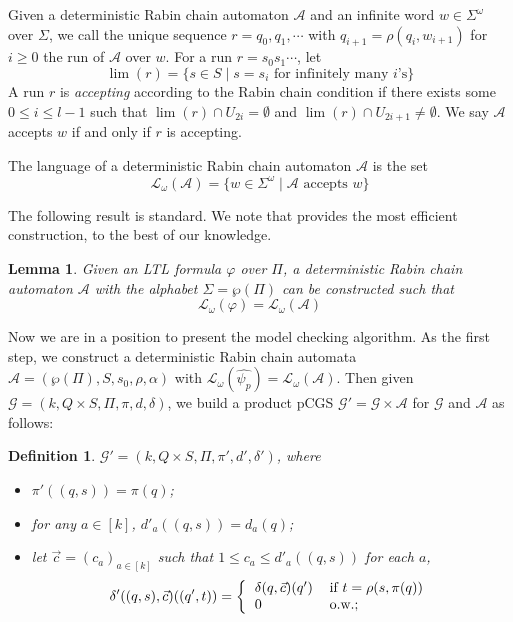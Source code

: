 \documentclass[times, 10 pt,twocolumn]{article}
\newtheorem{definition}[theorem]{Definition}{\bfseries}{\rm}
\newtheorem{lemma}[theorem]{Lemma}{\bfseries}{\itshape}
\newcommand{\mc}[1]{\mathcal{#1}}
\begin{document}
Given a deterministic Rabin chain automaton $\mc{A}$ and an
infinite word $w\in \Sigma^{\omega}$ over $\Sigma$, we call the
unique sequence $r=q_0,q_1, \cdots$ with $q_{i+1}=\rho(q_i,
w_{i+1})$ for $i\geq 0$ the run of $\mc{A}$ over $w$. For a run
$r=s_0s_1\cdots$, let
\[\lim(r)=\{s\in S\mid s=s_i\mbox{ for infinitely many }i\mbox{'s}\}\]
A run $r$ is \emph{accepting} according to the Rabin chain
condition if there exists some $0\leq i\leq l-1$ such that
$\lim(r)\cap U_{2i}=\emptyset$ and $\lim(r)\cap
U_{2i+1}\neq\emptyset$. We say $\mc{A}$ accepts $w$ if and only if
$r$ is accepting.

The language of a deterministic Rabin chain automaton $\mc{A}$ is
the set
\[\mc{L}_{\omega}(\mc{A})=\{w\in \Sigma^{\omega}\mid \mc{A}\mbox{ accepts }w\}\]

The following result is standard. We note that \cite{Pit06}
provides the most efficient construction, to the best of our
knowledge.
\begin{lemma}
  Given an LTL formula $\varphi$ over $\Pi$, a deterministic Rabin
  chain automaton $\mc{A}$ with the alphabet $\Sigma=\wp(\Pi)$ can be
  constructed such that
  \[\mc{L}_{\omega}(\varphi)=\mc{L}_{\omega}(\mc{A})\]
\end{lemma}

Now we are in a position to present the model checking algorithm.
As the first step, we construct a deterministic Rabin chain
automata $\mc{A}=(\wp(\Pi), S, s_0, \rho, \alpha)$ with
$\mc{L}_{\omega}(\widehat{\psi_p})=\mc{L}_{\omega}(\mc{A})$. Then
given $\mc{G}=(k, Q\times S, \Pi, \pi, d, \delta)$, we build a
product pCGS $\mc{G}'=\mc{G}\times \mc{A}$ for $\mc{G}$ and
$\mc{A}$ as follows:
\begin{definition}
$\mc{G}' = (k, Q\times S, \Pi, \pi', d', \delta')$, where
\begin{itemize}
\item $\pi'((q,s))=\pi(q)$;

\item for any $a\in [k]$, $d'_a((q, s))=d_a(q)$;

\item let $\vec{c}= (c_a)_{a\in [k]}$ such that $1\leq c_a\leq
d'_a((q, s))$ for each $a$,
\[\delta'((q,s), \vec{c})((q', t)) = \left\{
\begin{tabular}{ll}
$\delta(q, \vec{c})(q')$ & if $t=\rho(s,\pi(q))$ \\
$0$                      & o.w.;
\end{tabular}
\right.\]
\end{itemize}
\end{definition}
\end{document}
